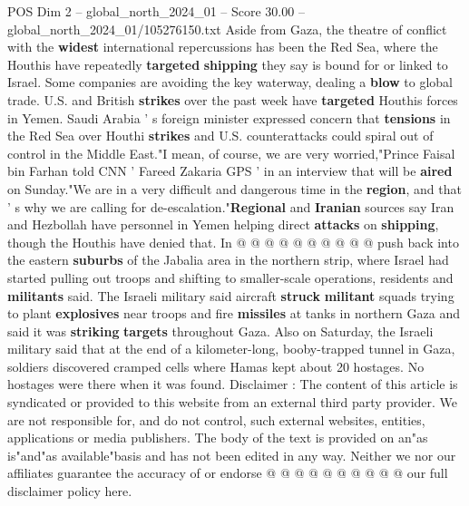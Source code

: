 \begin{textsample}{POS Dim 2 – global\_north\_2024\_01 – Score 30.00 – global\_north\_2024\_01/105276150.txt}
Aside from Gaza, the theatre of conflict with the \textbf{widest} international repercussions has been the Red Sea, where the Houthis have repeatedly \textbf{targeted} \textbf{shipping} they say is bound for or linked to Israel.
Some companies are avoiding the key waterway, dealing a \textbf{blow} to global trade.
U.S. and British \textbf{strikes} over the past week have \textbf{targeted} Houthis forces in Yemen.
Saudi Arabia ' s foreign minister expressed concern that \textbf{tensions} in the Red Sea over Houthi \textbf{strikes} and U.S. counterattacks could spiral out of control in the Middle East."I mean, of course, we are very worried,"Prince Faisal bin Farhan told CNN ' Fareed Zakaria GPS ' in an interview that will be \textbf{aired} on Sunday."We are in a very difficult and dangerous time in the \textbf{region}, and that ' s why we are calling for de-escalation."\textbf{Regional} and \textbf{Iranian} sources say Iran and Hezbollah have personnel in Yemen helping direct \textbf{attacks} on \textbf{shipping}, though the Houthis have denied that.
In @ @ @ @ @ @ @ @ @ @ push back into the eastern \textbf{suburbs} of the Jabalia area in the northern strip, where Israel had started pulling out troops and shifting to smaller-scale operations, residents and \textbf{militants} said.
The Israeli military said aircraft \textbf{struck} \textbf{militant} squads trying to plant \textbf{explosives} near troops and fire \textbf{missiles} at tanks in northern Gaza and said it was \textbf{striking} \textbf{targets} throughout Gaza.
Also on Saturday, the Israeli military said that at the end of a kilometer-long, booby-trapped tunnel in Gaza, soldiers discovered cramped cells where Hamas kept about 20 hostages.
No hostages were there when it was found.
Disclaimer : The content of this article is syndicated or provided to this website from an external third party provider.
We are not responsible for, and do not control, such external websites, entities, applications or media publishers.
The body of the text is provided on an"as is"and"as available"basis and has not been edited in any way.
Neither we nor our affiliates guarantee the accuracy of or endorse @ @ @ @ @ @ @ @ @ @ our full disclaimer policy here.

\end{textsample}
